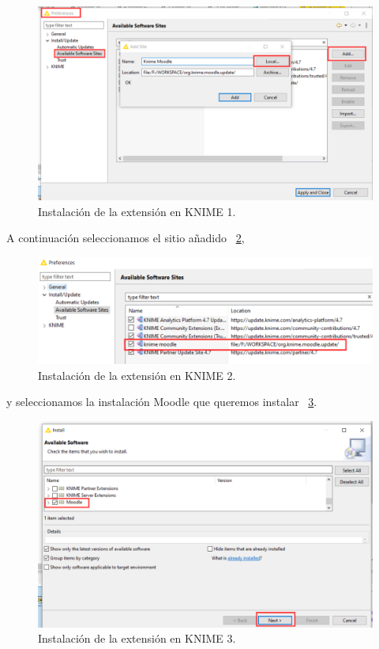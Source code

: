 \begin{figure}[!htb]
	\centering
	\includegraphics[width=1\textwidth]{img/manual_usuario_install_site_update1.png}
	\caption{Instalación de la extensión  en KNIME 1.}
	\label{fig:usuario1}
\end{figure}
\FloatBarrier

A continuación seleccionamos el sitio añadido ~\ref{fig:usuario2},

\begin{figure}[!htb]
	\centering
	\includegraphics[width=1\textwidth]{img/manual_usuario_install_site_update2.png}
	\caption{Instalación de la extensión  en KNIME 2.}
	\label{fig:usuario2}
\end{figure}
\FloatBarrier

y seleccionamos la instalación Moodle que queremos instalar ~\ref{fig:usuario3}.

\begin{figure}[!htb]
	\centering
	\includegraphics[width=1\textwidth]{img/manual_usuario_install_site_update3.png}
	\caption{Instalación de la extensión  en KNIME 3.}
	\label{fig:usuario3}
\end{figure}
\FloatBarrier

